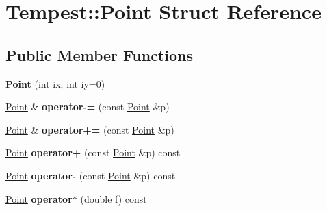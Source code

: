 \hypertarget{struct_tempest_1_1_point}{\section{Tempest\+:\+:Point Struct Reference}
\label{struct_tempest_1_1_point}
}
\subsection*{Public Member Functions}
\begin{DoxyCompactItemize}
\item 
\hypertarget{struct_tempest_1_1_point_a50e711a97d1381bf7e52a803348b947f}{{\bfseries Point} (int ix, int iy=0)}\label{struct_tempest_1_1_point_a50e711a97d1381bf7e52a803348b947f}

\item 
\hypertarget{struct_tempest_1_1_point_a112af79292ca9dce2281f71fab053db8}{\hyperlink{struct_tempest_1_1_point}{Point} \& {\bfseries operator-\/=} (const \hyperlink{struct_tempest_1_1_point}{Point} \&p)}\label{struct_tempest_1_1_point_a112af79292ca9dce2281f71fab053db8}

\item 
\hypertarget{struct_tempest_1_1_point_ae25b726a057b78fd66bdf470b2c79f44}{\hyperlink{struct_tempest_1_1_point}{Point} \& {\bfseries operator+=} (const \hyperlink{struct_tempest_1_1_point}{Point} \&p)}\label{struct_tempest_1_1_point_ae25b726a057b78fd66bdf470b2c79f44}

\item 
\hypertarget{struct_tempest_1_1_point_a78421c6bc6fe671fa5ee80e99c0b7284}{\hyperlink{struct_tempest_1_1_point}{Point} {\bfseries operator+} (const \hyperlink{struct_tempest_1_1_point}{Point} \&p) const }\label{struct_tempest_1_1_point_a78421c6bc6fe671fa5ee80e99c0b7284}

\item 
\hypertarget{struct_tempest_1_1_point_a6a869eababaaf863740e3196b9ca6780}{\hyperlink{struct_tempest_1_1_point}{Point} {\bfseries operator-\/} (const \hyperlink{struct_tempest_1_1_point}{Point} \&p) const }\label{struct_tempest_1_1_point_a6a869eababaaf863740e3196b9ca6780}

\item 
\hypertarget{struct_tempest_1_1_point_a59d99c4a052621010a07342b0bb6d5ed}{\hyperlink{struct_tempest_1_1_point}{Point} {\bfseries operator$\ast$} (double f) const }\label{struct_tempest_1_1_point_a59d99c4a052621010a07342b0bb6d5ed}


\end{DoxyCompactItemize}
